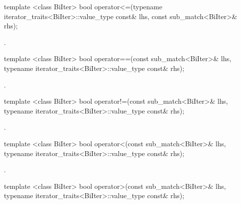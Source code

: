 %
%
\begin{itemdecl}
template <class BiIter> 
  bool operator<=(typename iterator_traits<BiIter>::value_type const& lhs, 
                  const sub_match<BiIter>& rhs); 
\end{itemdecl}

\begin{itemdescr}
\pnum
\returns {}.
\end{itemdescr}

%
%
\begin{itemdecl}
template <class BiIter> 
  bool operator==(const sub_match<BiIter>& lhs, 
                  typename iterator_traits<BiIter>::value_type const& rhs); 
\end{itemdecl}

\begin{itemdescr}
\pnum
\returns {}.
\end{itemdescr}

%
%
\begin{itemdecl}
template <class BiIter> 
  bool operator!=(const sub_match<BiIter>& lhs, 
                  typename iterator_traits<BiIter>::value_type const& rhs); 
\end{itemdecl}

\begin{itemdescr}
\pnum
\returns {}.
\end{itemdescr}

%
%
\begin{itemdecl}
template <class BiIter> 
  bool operator<(const sub_match<BiIter>& lhs, 
                 typename iterator_traits<BiIter>::value_type const& rhs); 
\end{itemdecl}

\begin{itemdescr}
\pnum
\returns {}.
\end{itemdescr}

%
%
\begin{itemdecl}
template <class BiIter> 
  bool operator>(const sub_match<BiIter>& lhs, 
                 typename iterator_traits<BiIter>::value_type const& rhs); 
\end{itemdecl}

